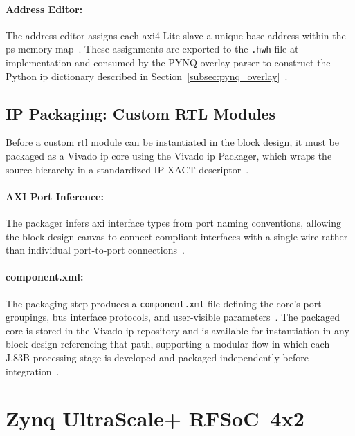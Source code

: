 \paragraph{Address Editor:}
The address editor assigns each \ac{axi}4-Lite slave a unique base
address within the \ac{ps} memory map~\cite{AMD_UG1085}.
These assignments are exported to the \texttt{.hwh} file at
implementation and consumed by the PYNQ overlay parser to construct
the Python \ac{ip} dictionary described in
Section~\ref{subsec:pynq_overlay}~\cite{PYNQ_DOC}.


\subsection{IP Packaging: Custom RTL Modules}
\label{subsec:ip_packaging}

Before a custom \ac{rtl} module can be instantiated in the block
design, it must be packaged as a Vivado \ac{ip} core using the
Vivado \ac{ip} Packager, which wraps the source hierarchy in a
standardized IP-XACT descriptor~\cite{AMD_UG994}.

\paragraph{AXI Port Inference:}
The packager infers \ac{axi} interface types from port naming
conventions, allowing the block design canvas to connect compliant
interfaces with a single wire rather than individual port-to-port
connections~\cite{AMD_UG994}.

\paragraph{component.xml:}
The packaging step produces a \texttt{component.xml} file defining
the core's port groupings, bus interface protocols, and
user-visible parameters~\cite{AMD_UG994}.
The packaged core is stored in the Vivado \ac{ip} repository and is
available for instantiation in any block design referencing that
path, supporting a modular flow in which each J.83B processing
stage is developed and packaged independently before
integration~\cite{Kovacs2024}.




\section{Zynq UltraScale+ RFSoC~4x2}
\label{sec:rfsoc4x2}

